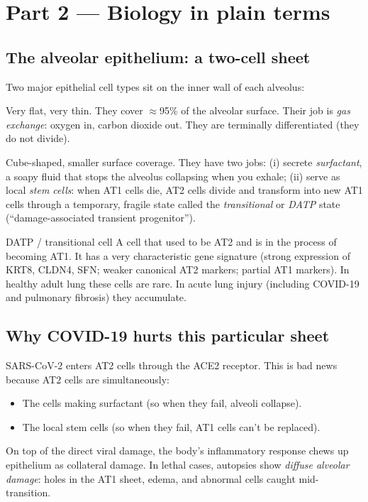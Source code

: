 \documentclass[11pt]{article}
\begin{document}
\section{Part 2 --- Biology in plain terms}

\subsection{The alveolar epithelium: a two-cell sheet}

Two major epithelial cell types sit on the inner wall of each alveolus:

\begin{description}[style=nextline]
\item[AT1 cells (alveolar type 1)] Very flat, very thin. They cover
$\approx$95\% of the alveolar surface. Their job is \emph{gas exchange}:
oxygen in, carbon dioxide out. They are terminally differentiated (they do
not divide).
\item[AT2 cells (alveolar type 2)] Cube-shaped, smaller surface coverage.
They have two jobs: (i) secrete \emph{surfactant}, a soapy fluid that stops
the alveolus collapsing when you exhale; (ii) serve as local \emph{stem cells}:
when AT1 cells die, AT2 cells divide and transform into new AT1 cells through
a temporary, fragile state called the \emph{transitional} or \emph{DATP}
state (``damage-associated transient progenitor'').
\end{description}

\begin{jargon}{DATP / transitional cell}
A cell that used to be AT2 and is in the process of becoming AT1. It has a
very characteristic gene signature (strong expression of KRT8, CLDN4, SFN;
weaker canonical AT2 markers; partial AT1 markers). In healthy adult lung
these cells are rare. In acute lung injury (including COVID-19 and
pulmonary fibrosis) they accumulate.
\end{jargon}

\subsection{Why COVID-19 hurts this particular sheet}

SARS-CoV-2 enters AT2 cells through the ACE2 receptor. This is bad news because
AT2 cells are simultaneously:
\begin{itemize}
\item The cells making surfactant (so when they fail, alveoli collapse).
\item The local stem cells (so when they fail, AT1 cells can't be replaced).
\end{itemize}
On top of the direct viral damage, the body's inflammatory response chews up
epithelium as collateral damage. In lethal cases, autopsies show \emph{diffuse
alveolar damage}: holes in the AT1 sheet, edema, and abnormal cells caught
mid-transition.
\end{document}
